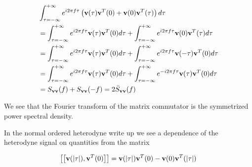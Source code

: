 \documentclass[12pt]{article}
\newcommand{\bv}[1]{\bold{#1}}
\begin{document}
\begin{align}
&\int_{\tau=-\infty}^{+\infty}e^{i 2\pi f \tau}\left(\bv{v}(\tau)\bv{v}^T(0) + \bv{v}(0)\bv{v}^T(\tau)\right) d\tau\\
&=\int_{\tau=-\infty}^{+\infty}e^{i 2\pi f \tau}\bv{v}(\tau)\bv{v}^T(0) d\tau + \int_{\tau=-\infty}^{+\infty}e^{i 2\pi f \tau}\bv{v}(0)\bv{v}^T(\tau) d\tau\\
&=\int_{\tau=-\infty}^{+\infty}e^{i 2\pi f \tau}\bv{v}(\tau)\bv{v}^T(0) d\tau + \int_{\tau=-\infty}^{+\infty}e^{i 2\pi f \tau}\bv{v}(-\tau)\bv{v}^T(0) d\tau\\
&=\int_{\tau=-\infty}^{+\infty}e^{i 2\pi f \tau}\bv{v}(\tau)\bv{v}^T(0) d\tau + \int_{\tau=-\infty}^{+\infty}e^{-i 2\pi f \tau}\bv{v}(\tau)\bv{v}^T(0) d\tau\\
&= S_{\bv{v}\bv{v}}(f) + S_{\bv{v}\bv{v}}(-f) = 2\bar{S}_{\bv{v}\bv{v}}(f)
\end{align}

We see that the Fourier transform of the matrix commutator is the symmetrized power spectral density.

In the normal ordered heterodyne write up we see a dependence of the heterodyne signal on quantities from the matrix

\begin{align}
\left[\left[\bv{v}(|\tau|),\bv{v}^T(0)\right]\right] = \bv{v}(|\tau|)\bv{v}^T(0) - \bv{v}(0)\bv{v}^T(|\tau|)
\end{align}
\end{document}
